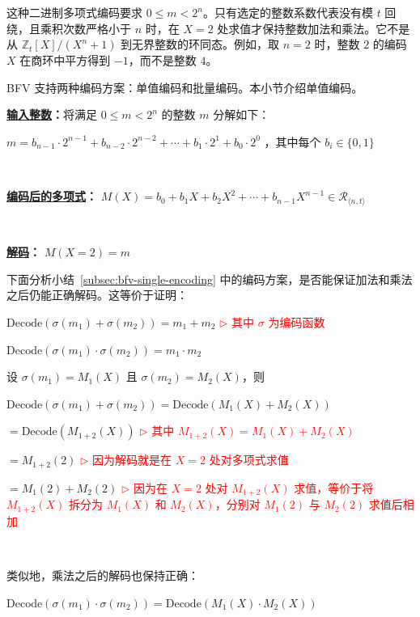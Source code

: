 这种二进制多项式编码要求 $0\leq m<2^n$。只有选定的整数系数代表没有模 $t$ 回绕，且乘积次数严格小于 $n$ 时，在 $X=2$ 处求值才保持整数加法和乘法。它不是从 $\mathbb Z_t[X]/(X^n+1)$ 到无界整数的环同态。例如，取 $n=2$ 时，整数 $2$ 的编码 $X$ 在商环中平方得到 $-1$，而不是整数 $4$。

BFV 支持两种编码方案：单值编码和批量编码。本小节介绍单值编码。



\begin{tcolorbox}[title={\textbf{\tboxlabel{\ref*{subsec:bfv-single-encoding}} BFV 编码}}]

\textbf{\underline{输入整数}：}将满足 $0\leq m<2^n$ 的整数 $m$ 分解如下：

$m = b_{n-1}\cdot 2^{n-1} + b_{n-2}\cdot 2^{n-2} + \cdots + b_1\cdot 2^1 + b_0\cdot 2^0$  \text { } ，其中每个 $b_i \in \{0, 1\}$

$ $


\textbf{\underline{编码后的多项式}：} $M(X) = b_0 + b_1X + b_2X^2 + \cdots + b_{n-1}X^{n-1} \in \mathcal{R}_{\langle n, t\rangle}$

$ $

\textbf{\underline{解码}：} $M(X=2) = m$

\end{tcolorbox}


下面分析小结~\ref*{subsec:bfv-single-encoding} 中的编码方案，是否能保证加法和乘法之后仍能正确解码。这等价于证明：

$\text{Decode}(\sigma(m_1) + \sigma(m_2)) = m_1 + m_2$ \textcolor{red}{$\rhd$ 其中 $\sigma$ 为编码函数}

$\text{Decode}(\sigma(m_1) \cdot \sigma(m_2)) = m_1 \cdot m_2$

设 $\sigma(m_1) = M_1(X)$ 且 $\sigma(m_2) = M_2(X)$，则

$\text{Decode}(\sigma(m_1) + \sigma(m_2)) = \text{Decode}(M_1(X) + M_2(X))$


$= \text{Decode}(M_{1+2}(X))$ \textcolor{red}{$\rhd$ 其中 $M_{1+2}(X) = M_1(X) + M_2(X)$}

$= M_{1+2}(2)$ \textcolor{red}{$\rhd$ 因为解码就是在 $X = 2$ 处对多项式求值}

$= M_{1}(2) + M_{2}(2)$ \textcolor{red}{$\rhd$ 因为在 $X=2$ 处对 $M_{1+2}(X)$ 求值，等价于将 $M_{1+2}(X)$ 拆分为 $M_{1}(X)$ 和 $M_{2}(X)$，分别对 $M_1(2)$ 与 $M_2(2)$ 求值后相加}

$ $

类似地，乘法之后的解码也保持正确：

$\text{Decode}(\sigma(m_1) \cdot \sigma(m_2)) = \text{Decode}(M_1(X) \cdot M_2(X))$

